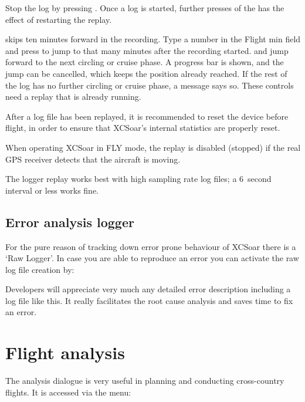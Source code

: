 Stop the log by pressing .
Once a log is started, further presses of the  has the
effect of restarting the replay.

 skips ten minutes forward in the recording.  Type a
number in the Flight min field and press  to jump to that
many minutes after the recording started.   and
 jump forward to the next circling or cruise phase.  A
progress bar is shown, and the jump can be cancelled, which keeps the
position already reached.  If the rest of the log has no further
circling or cruise phase, a message says so.  These controls need a
replay that is already running.

\tip{} After a log file has been replayed, it is recommended to reset
the device before flight, in order to ensure that XCSoar's internal
statistics are properly reset.

When operating XCSoar in FLY mode, the replay is disabled (stopped) if
the real GPS receiver detects that the aircraft is moving.

The logger replay works best with high sampling rate log files;
a 6~second interval or less works fine.

\subsection*{Error analysis logger}\label{sec:raw-logger}
For the pure reason of tracking down error prone behaviour of XCSoar
there is a `Raw Logger'. In case you are able to reproduce an error you can
activate the raw log file creation by:
\begin{quote}
\blink{}
\end{quote}
Developers will appreciate very much any detailed error description including a log file like this. It really facilitates the root cause analysis and saves time to fix an error.

\section{Flight analysis}\label{sec:analysis-climb}

The analysis dialogue is very useful in planning and conducting
cross-country flights.  It is accessed via the menu:  
\begin{quote}
\blink{}
\end{quote}

